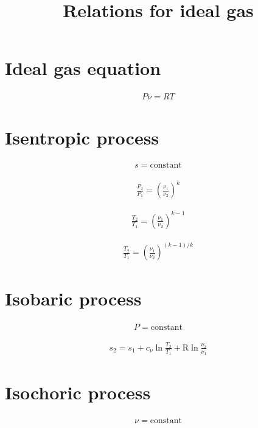 \documentclass{article}
\title{Relations for ideal gas}
\begin{document}
	\maketitle

	\section{Ideal gas equation}

	\begin{align*}
		P\nu = RT
	\end{align*}

	\section{Isentropic process}

	\begin{align*}
		s = \text{constant}
	\end{align*}

	\begin{align*}
		\frac{P_2}{P_1} = \left(\frac{\nu_1}{\nu_2}\right)^k
	\end{align*}

	\begin{align*}
		\frac{T_2}{T_1} = \left(\frac{\nu_1}{\nu_2}\right)^{k-1}
	\end{align*}

	\begin{align*}
		\frac{T_2}{T_1} = \left(\frac{\nu_1}{\nu_2}\right)^{(k-1)/k}
	\end{align*}

	\section{Isobaric process}

	\begin{align*}
		P = \text{constant}
	\end{align*}

	\begin{align*}
		s_2 = s_1 + c_\nu \ln\frac{T_2}{T_1} + \text{R}\ln\frac{\nu_2}{\nu_1}
	\end{align*}

	\section{Isochoric process}

	\begin{align*}
		\nu = \text{constant}
	\end{align*}
\end{document}
